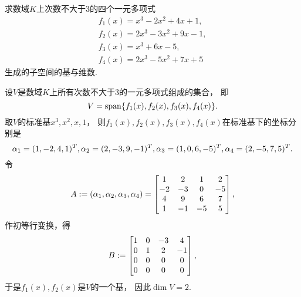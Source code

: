 \begin{example}
求数域\(K\)上次数不大于\(3\)的四个一元多项式\begin{gather*}
	f_1(x) = x^3 - 2x^2 + 4x + 1, \\
	f_2(x) = 2x^3 - 3x^2 + 9x - 1, \\
	f_3(x) = x^3 + 6x - 5, \\
	f_4(x) = 2x^3 - 5x^2 + 7x + 5
\end{gather*}
生成的子空间的基与维数.
\begin{solution}
设\(V\)是数域\(K\)上所有次数不大于\(3\)的一元多项式组成的集合，
即\begin{equation*}
	V = \operatorname{span}\{f_1(x),f_2(x),f_3(x),f_4(x)\}.
\end{equation*}
取\(V\)的标准基\(x^3,x^2,x,1\)，
则\(f_1(x),f_2(x),f_3(x),f_4(x)\)在标准基下的坐标分别是\begin{equation*}
	\alpha_1 = (1,-2,4,1)^T, \\
	\alpha_2 = (2,-3,9,-1)^T, \\
	\alpha_3 = (1,0,6,-5)^T, \\
	\alpha_4 = (2,-5,7,5)^T.
\end{equation*}
令\begin{equation*}
	A := (\alpha_1,\alpha_2,\alpha_3,\alpha_4)
	= \begin{bmatrix}
		1 & 2 & 1 & 2 \\
		-2 & -3 & 0 & -5 \\
		4 & 9 & 6 & 7 \\
		1 & -1 & -5 & 5 \\
	\end{bmatrix},
\end{equation*}
作初等行变换，得\begin{equation*}
	B := \begin{bmatrix}
		1 & 0 & -3 & 4 \\
		0 & 1 & 2 & -1 \\
		0 & 0 & 0 & 0 \\
		0 & 0 & 0 & 0 \\
	\end{bmatrix},
\end{equation*}
于是\(f_1(x),f_2(x)\)是\(V\)的一个基，
因此\(\dim V = 2\).
\end{solution}
\end{example}

